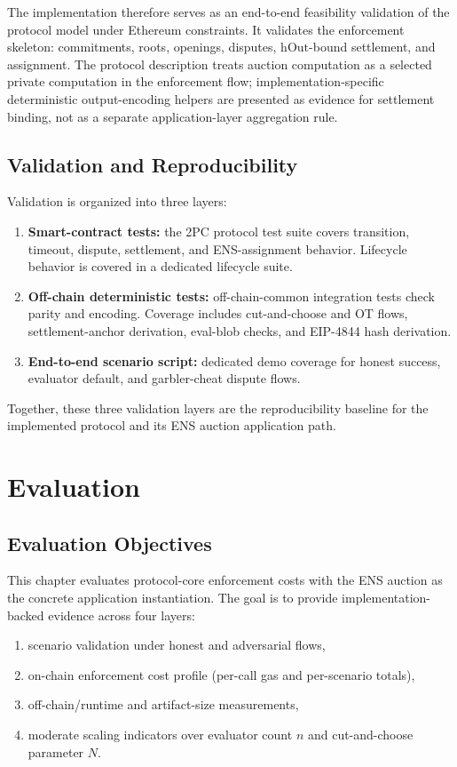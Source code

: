 \documentclass[final,twoside]{vutinfth}
\begin{document}
The implementation therefore serves as an end-to-end feasibility validation of
the protocol model under Ethereum constraints.
It validates the enforcement skeleton: commitments, roots, openings, disputes,
\(\mathrm{hOut}\)-bound settlement, and assignment.
The protocol description treats auction computation as a selected private
computation in the enforcement flow;
implementation-specific deterministic output-encoding helpers are presented as
evidence for settlement binding, not as a separate application-layer
aggregation rule.

\section{Validation and Reproducibility}
Validation is organized into three layers:
\begin{enumerate}
\item \textbf{Smart-contract tests:} the 2PC protocol test suite covers transition, timeout, dispute, settlement, and ENS-assignment behavior. Lifecycle behavior is covered in a dedicated lifecycle suite.
\item \textbf{Off-chain deterministic tests:} off-chain-common integration tests check parity and encoding. Coverage includes cut-and-choose and OT flows, settlement-anchor derivation, eval-blob checks, and EIP-4844 hash derivation.
\item \textbf{End-to-end scenario script:} dedicated demo coverage for honest success, evaluator default, and garbler-cheat dispute flows.
\end{enumerate}

Together, these three validation layers are the reproducibility baseline for the implemented protocol and its ENS auction application path.

\chapter{Evaluation}
\section{Evaluation Objectives}
This chapter evaluates protocol-core enforcement costs with the ENS auction as
the concrete application instantiation.
The goal is to provide implementation-backed evidence across four layers:
\begin{enumerate}
\item scenario validation under honest and adversarial flows,
\item on-chain enforcement cost profile (per-call gas and per-scenario totals),
\item off-chain/runtime and artifact-size measurements,
\item moderate scaling indicators over evaluator count \(n\) and cut-and-choose parameter \(N\).
\end{enumerate}
\end{document}
